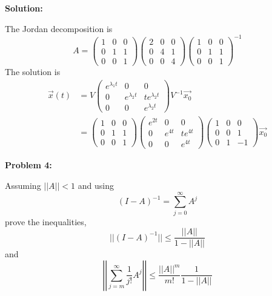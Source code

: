 \documentclass[12pt]{article}
\newenvironment{problem}[1]{
    \textbf{Problem #1:}
}{
    \rmfamily \vspace{2em}
}
\newenvironment{solution}{
    \textbf{Solution:}
    
}{
    
    \vspace{2em}
}
\begin{document}
\begin{solution}
    The Jordan decomposition is
    \[
        A = \begin{pmatrix} 1 & 0 & 0 \\ 0 & 1 & 1 \\ 0 & 0 & 1 \end{pmatrix} \begin{pmatrix} 2 & 0 & 0 \\ 0 & 4 & 1 \\ 0 & 0 & 4 \end{pmatrix} \begin{pmatrix} 1 & 0 & 0 \\ 0 & 1 & 1 \\ 0 & 0 & 1 \end{pmatrix}^{-1}
    \]
    The solution is
    \[
        \begin{aligned}
            \vec{x}(t) &= V \begin{pmatrix} e^{\lambda_1 t} & 0 & 0 \\ 0 & e^{\lambda_2 t} & te^{\lambda_2 t} \\ 0 & 0 & e^{\lambda_2 t} \end{pmatrix} V^{-1} \vec{x_0}\\
            &= \begin{pmatrix} 1 & 0 & 0 \\ 0 & 1 & 1 \\ 0 & 0 & 1 \end{pmatrix} \begin{pmatrix} e^{2t} & 0 & 0 \\ 0 & e^{4t} & te^{4t} \\ 0 & 0 & e^{4t} \end{pmatrix} \begin{pmatrix} 1 & 0 & 0 \\ 0 & 0 & 1 \\ 0 & 1 & -1 \end{pmatrix} \vec{x_0}
        \end{aligned}
    \]
    

\end{solution}

\newpage

\begin{problem}{4}
    Assuming \(||A|| < 1\) and using
    \[
        (I - A)^{-1} = \sum_{j=0}^{\infty} A^j
    \]
    prove the inequalities,
    \[
        ||(I - A)^{-1}|| \leq \frac{||A||}{1 - ||A||}
    \]
    and
    \[
        \left|\left|\sum_{j=m}^{\infty} \frac{1}{j!}A^j \right|\right| \leq \frac{||A||^m}{m!}\frac{1}{1 - ||A||}
    \]
\end{problem}
\end{document}
